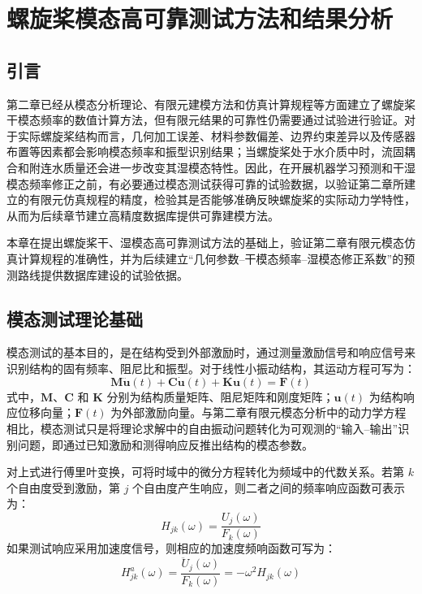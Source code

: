 ﻿\chapter{螺旋桨模态高可靠测试方法和结果分析}

\section{引言}

第二章已经从模态分析理论、有限元建模方法和仿真计算规程等方面建立了螺旋桨干模态频率的数值计算方法，但有限元结果的可靠性仍需要通过试验进行验证。对于实际螺旋桨结构而言，几何加工误差、材料参数偏差、边界约束差异以及传感器布置等因素都会影响模态频率和振型识别结果；当螺旋桨处于水介质中时，流固耦合和附连水质量还会进一步改变其湿模态特性。因此，在开展机器学习预测和干湿模态频率修正之前，有必要通过模态测试获得可靠的试验数据，以验证第二章所建立的有限元仿真规程的精度，检验其是否能够准确反映螺旋桨的实际动力学特性，从而为后续章节建立高精度数据库提供可靠建模方法。

本章在提出螺旋桨干、湿模态高可靠测试方法的基础上，验证第二章有限元模态仿真计算规程的准确性，并为后续建立“几何参数--干模态频率--湿模态修正系数”的预测路线提供数据库建设的试验依据。

\section{模态测试理论基础}

模态测试的基本目的，是在结构受到外部激励时，通过测量激励信号和响应信号来识别结构的固有频率、阻尼比和振型。对于线性小振动结构，其运动方程可写为：
\begin{equation}
  \mathbf{M}\ddot{\mathbf{u}}(t) + \mathbf{C}\dot{\mathbf{u}}(t) + \mathbf{K}\mathbf{u}(t) = \mathbf{F}(t)
\end{equation}
式中，$\mathbf{M}$、$\mathbf{C}$ 和 $\mathbf{K}$ 分别为结构质量矩阵、阻尼矩阵和刚度矩阵；$\mathbf{u}(t)$ 为结构响应位移向量；$\mathbf{F}(t)$ 为外部激励向量。与第二章有限元模态分析中的动力学方程相比，模态测试只是将理论求解中的自由振动问题转化为可观测的“输入--输出”识别问题，即通过已知激励和测得响应反推出结构的模态参数。

对上式进行傅里叶变换，可将时域中的微分方程转化为频域中的代数关系。若第 $k$ 个自由度受到激励，第 $j$ 个自由度产生响应，则二者之间的频率响应函数可表示为：
\begin{equation}
  H_{jk}(\omega) = \frac{U_j(\omega)}{F_k(\omega)}
\end{equation}
如果测试响应采用加速度信号，则相应的加速度频响函数可写为：
\begin{equation}
  H^{a}_{jk}(\omega) = \frac{\ddot{U}_j(\omega)}{F_k(\omega)} = -\omega^2 H_{jk}(\omega)
\end{equation}

